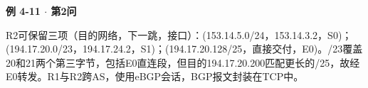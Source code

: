 {\color{ink}\bfseries 例 4-11 \(\cdot \) 第2问}\par\vspace{1bp}R2可保留三项（目的网络，下一跳，接口）：(153.14.5.0/\allowbreak{}24，153.14.3.2，S0)；(194.17.20.0/\allowbreak{}23，194.17.24.2，S1)；(194.17.20.128/\allowbreak{}25，直接交付，E0)。/\allowbreak{}23覆盖20和21两个第三字节，包括E0直连段，但目的194.17.20.200匹配更长的/\allowbreak{}25，故经E0转发。R1与R2跨AS，使用eBGP会话，BGP报文封装在TCP中。
